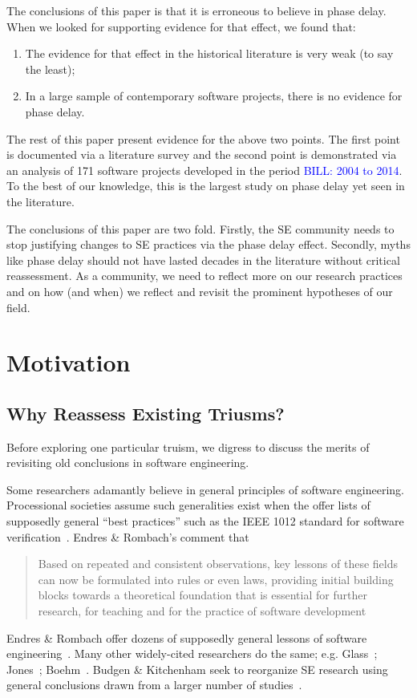 \documentclass{sig-alternate}
\newcommand{\bill}[1]{\textcolor{blue}{BILL: #1}}
\newcommand{\be}{\begin{enumerate}}
\newcommand{\ee}{\end{enumerate}}
\begin{document}
The conclusions of this paper is that it is erroneous to believe in phase delay.
When we looked for supporting evidence for that effect, we found that:
\be 
\item The evidence for that effect in the historical literature is very weak (to say the least);
\item  In  a large sample of   contemporary software projects, there is no evidence for phase delay.
 \ee
The rest of this paper present evidence for the above two points. 
The first point is  documented via  a literature survey and the second point is demonstrated
via an analysis of  
 171 software  projects developed in the period \bill{2004 to 2014}.  To the best of our knowledge,
 this is the largest study on phase delay yet seen in the literature.
 
The conclusions of this paper are two fold. Firstly, the SE community needs to stop
justifying changes to SE
practices via the phase delay effect. Secondly,   myths like phase delay should not have lasted decades
in the literature without  critical reassessment.  As a community, we need to reflect more on our
research practices and on how (and when) we reflect and revisit the prominent hypotheses of our field.


\section{Motivation}
\subsection{Why Reassess Existing Triusms?}

Before exploring one particular truism, we digress to discuss the merits of revisiting
old conclusions in software engineering.


Some researchers   adamantly believe in general
principles of software
engineering. Processional societies assume such generalities exist when the offer
 lists of  supposedly general ``best practices'' such as
the IEEE 1012 standard for software verification~\cite{1012}.  Endres \& Rombach's comment that 
\begin{quote}
Based on repeated and consistent observations, key lessons of these fields can now be formulated into rules or even laws, providing initial building blocks towards a theoretical foundation that is essential for further research, for teaching and for the practice of software development~\cite{endres03,rombach11}
\end{quote}
 Endres \& Rombach offer dozens of supposedly general lessons of software engineering~\cite{rombach11}.
 Many other 
widely-cited researchers  do the same; e.g.
Glass~\cite{glass02}; Jones~\cite{jones07}; Boehm~\cite{boehm00b}.
Budgen \& Kitchenham seek to reorganize SE research using
general
conclusions drawn from a larger number of studies~\cite{kitch04,budgen09}.
\end{document}
